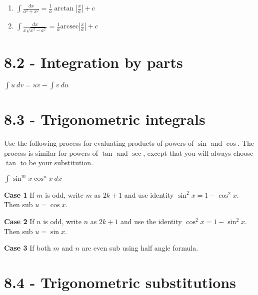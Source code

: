 \documentclass{article}
\begin{document}
\begin{multicols}{2}
{\begin{enumerate}
\item
$\int \frac{dx}{a^2+x^2}=\frac{1}{a} \arctan \left| \frac{x}{a} \right| + c$

\item
$\int \frac{dx}{x\sqrt{x^2-a^2}}=\frac{1}{a} \text{arcsec} \left| \frac{x}{a} \right| + c$

\end{enumerate}
}

\section*{8.2 - Integration by parts}

\begin{center}
\huge
$\int u~dv=uv-\int v~du$
\end{center}

\section*{8.3 - Trigonometric integrals}

Use the following process for evaluating products of powers of $\sin$ and $\cos$.
The process is similar for powers of $\tan$ and $\sec$, except that you will always choose
$\tan$ to be your substitution.

{\large
\begin{center}
$\int \sin^m x \cos^n x ~dx$
\end{center}
}

\textbf{Case 1} If $m$ is odd, write $m$ as $2k+1$ and use identity $\sin^2x=1-\cos^2x$.
Then sub $u=\cos x$.

\textbf{Case 2} If $n$ is odd, write $n$ as $2k+1$ and use the identity $\cos^2 x = 1-\sin^2 x$.
Then sub $u=\sin x$.

\textbf{Case 3} If both $m$ and $n$ are even sub using half angle formula.

\section*{8.4 - Trigonometric substitutions}

\begin{center}



\begin{tikzpicture}[x=0.75pt,y=0.75pt,yscale=-1,xscale=1]


\end{tikzpicture}
\end{center}
\end{multicols}
\end{document}

